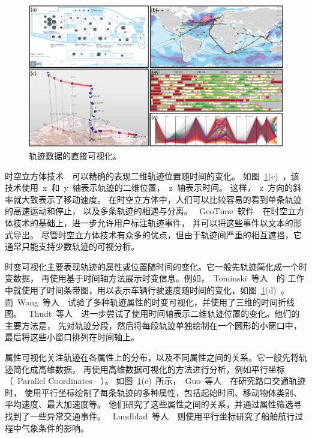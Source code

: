 \documentclass[12pt,twocolumn]{article}
\begin{document}
\begin{figure}[!htb]
\centering
\includegraphics[width=0.85\linewidth]{images/direct.eps}
\caption{\label{fig:direct}轨迹数据的直接可视化。
}
\end{figure}

时空立方体技术~\citep{Hagerstrand1970}~可以精确的表现二维轨迹位置随时间的变化。
如图~\ref{fig:direct}(c)~，该技术使用~x~和~y~轴表示轨迹的二维位置，~z~轴表示时间。
这样，~z~方向的斜率就大致表示了移动速度。
在时空立方体中，人们可以比较容易的看到单条轨迹的高速运动和停止，
以及多条轨迹的相遇与分离。
~GeoTime~软件~\citep{KaplerW2004,EcclesKHW2007}~在时空立方体技术的基础上，进一步允许用户标注轨迹事件，
并可以将这些事件以文本的形式导出。
尽管时空立方体技术有众多的优点，但由于轨迹间严重的相互遮挡，它通常只能支持少数轨迹的可视分析。

时变可视化主要表现轨迹的属性或位置随时间的变化。它一般先轨迹简化成一个时变数据，
再使用基于时间轴方法展示时变信息。例如，~Tominski~等人~\citep{TominskiSAA2012}~的
工作中就使用了时间条带图，用以表示车辆行驶速度随时间的变化，如图~\ref{fig:direct}(d)~。
而~Wang~等人~\citep{WangY2014}~试验了多种轨迹属性的时变可视化，并使用了三维的时间折线图。
~Thudt~等人~\citep{ThudtBC2013}~进一步尝试了使用时间轴表示二维轨迹位置的变化。他们的主要方法是，
先对轨迹分段，然后将每段轨迹单独绘制在一个圆形的小窗口中，最后将这些小窗口排列在时间轴上。

属性可视化关注轨迹在各属性上的分布，以及不同属性之间的关系。它一般先将轨迹简化成高维数据，
再使用高维数据可视化的方法进行分析，例如平行坐标（~Parallel Coordinates~\citep{Inselberg1985}~）。
如图~\ref{fig:direct}(e)~所示，~Guo~等人~\citep{GuoWYZY2011}~在研究路口交通轨迹时，
使用平行坐标绘制了每条轨迹的多种属性，包括起始时间、移动物体类别、平均速度、最大加速度等。
他们研究了这些属性之间的关系，并通过属性筛选寻找到了一些异常交通事件。
~Lundblad~等人~\citep{LundbladEH2009}~则使用平行坐标研究了船舶航行过程中气象条件的影响。
\end{document}
